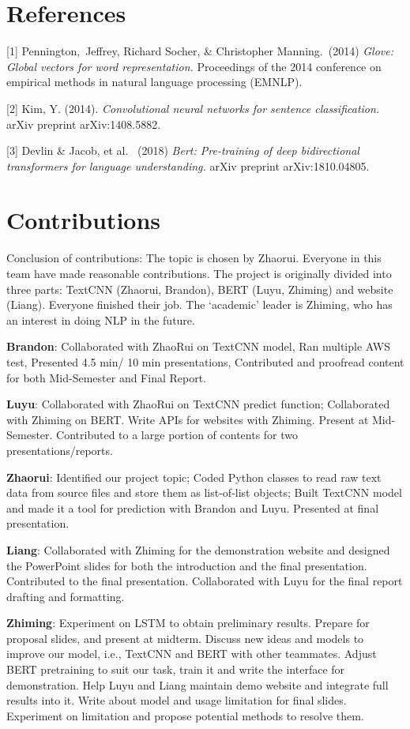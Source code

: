\documentclass{article}
\begin{document}
\section*{References}

\small

[1] Pennington,\ Jeffrey, Richard Socher, \& Christopher Manning.\ (2014) {\it Glove: Global vectors for word representation.} Proceedings of the 2014 conference on empirical methods in natural language processing (EMNLP).

[2] Kim, Y. (2014). {\it Convolutional neural networks for sentence classification.} arXiv preprint arXiv:1408.5882.

[3] Devlin \& Jacob, et al. \ (2018) {\it Bert: Pre-training of deep bidirectional transformers for language understanding.} arXiv preprint arXiv:1810.04805.


\section*{Contributions}
Conclusion of contributions: The topic is chosen by Zhaorui. Everyone in this team have made reasonable contributions. The project is originally divided into three parts: TextCNN (Zhaorui, Brandon), BERT (Luyu, Zhiming) and website (Liang). Everyone finished their job. The ‘academic’ leader is Zhiming, who has an interest in doing NLP in the future. 

\textbf{Brandon}: Collaborated with ZhaoRui on TextCNN model, Ran multiple AWS test, Presented 4.5 min/ 10 min presentations, Contributed and proofread content for both Mid-Semester and Final Report.  

\textbf{Luyu}: Collaborated with ZhaoRui on TextCNN predict function; Collaborated with Zhiming on BERT. Write APIs for websites with Zhiming. Present at Mid-Semester. Contributed to a large portion of contents for two presentations/reports.

\textbf{Zhaorui}: Identified our project topic; Coded Python classes to read raw text data from source files and store them as list-of-list objects; Built TextCNN model and made it a tool for prediction with Brandon and Luyu. Presented at final presentation. 

\textbf{Liang}: Collaborated with Zhiming for the demonstration website and designed the PowerPoint slides for both the introduction and the final presentation. Contributed to the final presentation. Collaborated with Luyu for the final report drafting and formatting. 

\textbf{Zhiming}: Experiment on LSTM to obtain preliminary results. Prepare for proposal slides, and present at midterm. Discuss new ideas and models to improve our model, i.e., TextCNN and BERT with other teammates. Adjust BERT pretraining to suit our task, train it and write the interface for demonstration. Help Luyu and Liang maintain demo website and integrate full results into it. Write about model and usage limitation for final slides. Experiment on limitation and propose potential methods to resolve them.
\end{document}

